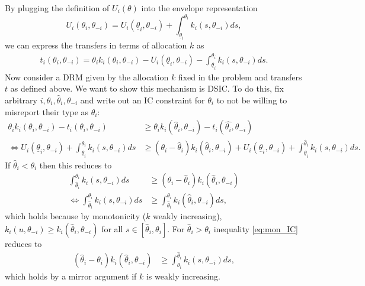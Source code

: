 \documentclass[a4paper]{article}
\begin{document}
	By plugging the definition of $U_i(\theta)$ into the envelope representation
	\begin{equation*}
		U_i(\theta_i, \theta_{-i}) = U_i (\underline{\theta}_i,\theta_{-i}) + \int_{\underline{\theta}_i}^{\theta_i} k_i(s,\theta_{-i}) d s,
	\end{equation*}
	we can express the transfers in terms of allocation $k$ as
	\begin{align*}
		t_i(\theta_i,\theta_{-i}) = \theta_i k_i(\theta_i,\theta_{-i}) - U_i(\underline{\theta}_{i}, \theta_{-i}) - \int_{\underline{\theta}_{i}}^{\theta_i} k_{i} (s,\theta_{-i}) ds.
	\end{align*}
	Now consider a DRM given by the allocation $k$ fixed in the problem and transfers $t$ as defined above. We want to show this mechanism is DSIC. To do this, fix arbitrary $i,\theta_i,\hat{\theta}_i,\theta_{-i}$ and write out an IC constraint for $\theta_i$ to not be willing to misreport their type as $\hat{\theta}_i$:
	\begin{align}
		\theta_i k_i(\theta_i,\theta_{-i}) - t_i(\theta_i,\theta_{-i}) &\geq \theta_i k_i(\hat{\theta}_i,\theta_{-i}) - t_i(\hat{\theta_i},\theta_{-i})
		\nonumber
		\\ \iff
		U_i(\underline{\theta}_{i}, \theta_{-i}) + \int_{\underline{\theta}_{i}}^{\theta_i} k_{i} (s,\theta_{-i}) ds &\geq \left( \theta_i - \hat{\theta}_i \right) k_i(\hat{\theta}_i,\theta_{-i}) + U_i(\underline{\theta}_{i}, \theta_{-i}) + \int_{\underline{\theta}_{i}}^{\hat{\theta}_i} k_{i} (s,\theta_{-i}) ds.
		\label{eq:mon_IC}
	\end{align}
	If $\hat{\theta}_i < \theta_i$ then this reduces to
	\begin{align*}
		\int_{\hat{\theta}_{i}}^{\theta_i} k_{i} (s,\theta_{-i}) ds &\geq \left( \theta_i - \hat{\theta}_i \right) k_i(\hat{\theta}_i,\theta_{-i})
		\\ \iff
		\int_{\hat{\theta}_{i}}^{\theta_i} k_{i} (s,\theta_{-i}) ds &\geq \int_{\hat{\theta}_{i}}^{\theta_i} k_{i} (\hat{\theta}_i,\theta_{-i}) ds,
	\end{align*}
	which holds because by monotonicity ($k$ weakly increasing), $k_{i} (u,\theta_{-i}) \geq k_{i} (\hat{\theta}_i,\theta_{-i})$ for all $s \in [\hat{\theta}_i, \theta_i]$. For $\hat{\theta}_i > \theta_i$ inequality \eqref{eq:mon_IC} reduces to
	\begin{align*}
		\left( \hat{\theta}_i - \theta_i \right) k_i(\hat{\theta}_i,\theta_{-i}) & \geq \int_{\theta_{i}}^{\hat{\theta}_i} k_{i} (s,\theta_{-i}) ds,
	\end{align*}
	which holds by a mirror argument if $k$ is weakly increasing.
\fi
\end{document}
